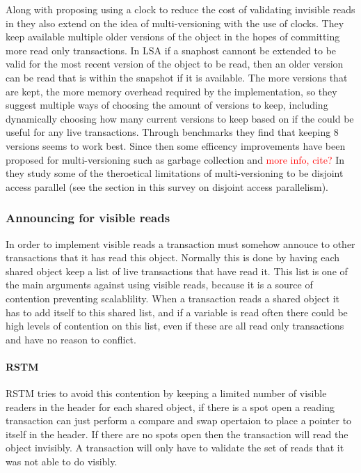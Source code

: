 Along with proposing using a clock to reduce the cost of validating invisible reads in \cite{10.1109/TPDS.2010.49} they also extend on the idea of multi-versioning with the use of clocks.
They keep available multiple older versions of the object in the hopes of committing more read only transactions.
In LSA if a snaphost cannont be extended to be valid for the most recent version of the object to be read, then an older version can be read that is within the snapshot if it is available.
The more versions that are kept, the more memory overhead required by the implementation, so they suggest multiple ways of choosing the amount of versions to keep, including dynamically choosing how many current versions to keep based on if the could  be useful for any live transactions.
Through benchmarks they find that keeping 8 versions seems to work best.
Since then some efficency improvements have been proposed for multi-versioning such as garbage collection and \textcolor{Red}{more info, cite?}
In \cite{1584015} they study some of the theroetical limitations of multi-versioning to be disjoint access parallel (see the section in this survey on disjoint access parallelism).

\subsubsection{Announcing for visible reads}
In order to implement visible reads a transaction must somehow annouce to other transactions that it has read this object.
Normally this is done by having each shared object keep a list of live transactions that have read it.
This list is one of the main arguments against using visible reads, because it is a source of contention preventing scalablility.
When a transaction reads a shared object it has to add itself to this shared list, and if a variable is read often there could be high levels of contention on this list, even if these are all read only transactions and have no reason to conflict.

\paragraph{RSTM}
RSTM \cite{Marathe06loweringthe} tries to avoid this contention by keeping a limited number of visible readers in the header for each shared object, if there is a spot open a reading transaction can just perform a compare and swap opertaion to place a pointer to itself in the header.
If there are no spots open then the transaction will read the object invisibly.
A transaction will only have to validate the set of reads that it was not able to do visibly.

